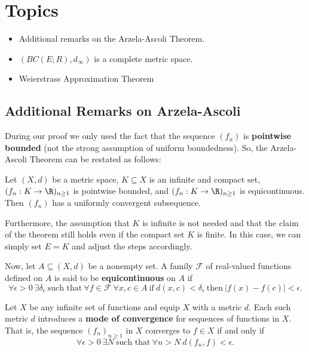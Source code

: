 \section{Topics}

\begin{itemize}
    \item Additional remarks on the Arzela-Ascoli Theorem.
    \item  \( (BC(E; R), {d}_{\infty }) \) is a complete metric space. 
    \item Weierstrass Approximation Theorem
\end{itemize}

\subsection{Additional Remarks on Arzela-Ascoli}

During our proof we only used the fact that the sequence \( ({f}_{n}) \) is \textbf{pointwise bounded} (not the strong assumption of uniform boundedness). So, the Arzela-Ascoli Theorem can be restated as follows:

\begin{theorem}
    Let \( (X,d) \) be a metric space, \( K \subseteq  X   \) is an infinite and compact set, \( ({f}_{n}: K \to \R )_{n \geq 1 } \) is pointwise bounded, and \( ({f}_{n}: K \to \R )_{n \geq 1} \) is equicontinuous. Then \( ({f}_{n}) \) has a uniformly convergent subsequence.
\end{theorem}

Furthermore, the assumption that \( K  \) is infinite is not needed and that the claim of the theorem still holds even if the compact set \( K  \) is finite. In this case, we can simply set \( E = K  \) and adjust the steps accordingly. 

Now, let \( A \subseteq  (X,d)  \) be a nonempty set. A family \( \mathcal{F} \) of real-valued functions defined on \( A  \) is said to be \textbf{equicontinuous} on \( A  \) if 
\[  \forall \epsilon > 0  \ \exists {\delta}_{\epsilon} \ \text{such that} \ \forall f \in \mathcal{F} \ \forall x,c \in A \ \text{if} \ d(x,c) < {\delta}_{\epsilon} \ \text{then} \ | f(x) - f(c) | < \epsilon.   \] 

Let \( X \) be any infinite set of functions and equip \( X  \) with a metric \( d \). Each such metric \( d \) introduces a \textbf{mode of convergence} for sequences of functions in \( X  \). That is, the sequence \( ({f}_{n})_{n \geq 1 } \) in \( X  \) converges to \( f \in X  \) if and only if
\[  \forall \epsilon  > 0 \ \exists N \ \text{such that} \ \forall n > N \ d({f}_{n}, f) < \epsilon.   \]

